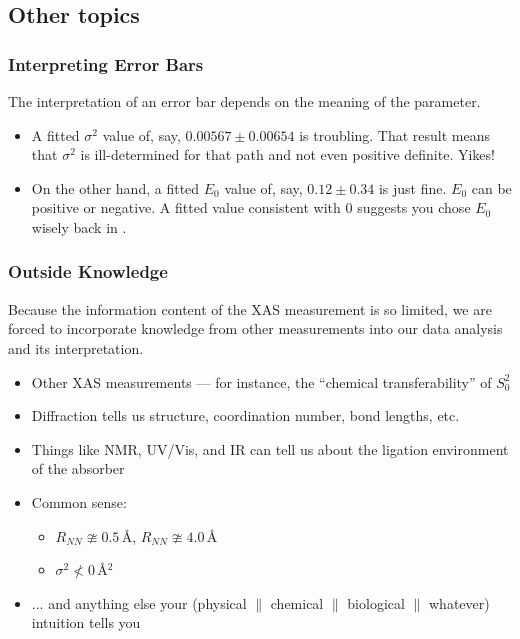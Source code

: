 \documentclass[10pt, xcolor=x11names, compress]{beamer}
\begin{document}
\subsection[Other topics]{Other topics}
\begin{frame}
  \frametitle{Interpreting Error Bars}
  \begin{exampleblock}{}
    \begin{center}
      The interpretation of an error bar depends on the meaning of the
      parameter.
    \end{center}
  \end{exampleblock}

  \bigskip

  \begin{itemize}[<+->]
  \item A fitted $\sigma^2$ value of, say, $0.00567\pm0.00654$ is
    troubling.  That result means that $\sigma^2$ is ill-determined
    for that path and not even positive definite.  Yikes!
  \item On the other hand, a fitted $E_0$ value of, say,
    $0.12\pm0.34$ is just fine.  $E_0$ can be positive or negative.
    A fitted value consistent with 0 suggests you chose $E_0$ wisely
    back in {\athena}.
  \end{itemize}
  
\end{frame}

\begin{frame}
  \frametitle{Outside Knowledge}

  Because the information content of the XAS measurement is so
  limited, we are forced to incorporate knowledge from other
  measurements into our data analysis and its interpretation.

  \begin{itemize}
  \item Other XAS measurements --- for instance, the ``chemical
    transferability'' of $S_0^2$
  \item Diffraction tells us structure, coordination number, bond
    lengths, etc.
  \item Things like NMR, UV/Vis, and IR can tell us about the ligation
    environment of the absorber
  \item Common sense:
    \begin{itemize}
    \item $R_{NN}\ncong0.5$\,\AA, $R_{NN}\ncong4.0$\,\AA
    \item $\sigma^2 \nless 0$\,\AA$^2$
    \end{itemize}
  \item ... and anything else your (physical $\parallel$ chemical
    $\parallel$ biological $\parallel$ whatever) intuition tells you
  \end{itemize}
\end{frame}
\end{document}
